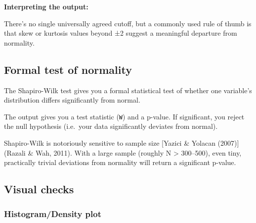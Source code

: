 \documentclass[
  letterpaper,
  DIV=11,
  numbers=noendperiod]{scrreprt}
\newenvironment{Shaded}{\begin{snugshade}}{\end{snugshade}}
\newcommand{\FunctionTok}[1]{\textcolor[rgb]{0.28,0.35,0.67}{#1}}
\newcommand{\NormalTok}[1]{\textcolor[rgb]{0.00,0.23,0.31}{#1}}
\newcommand{\SpecialCharTok}[1]{\textcolor[rgb]{0.37,0.37,0.37}{#1}}
\begin{document}
\textbf{Interpreting the output:}

There's no single universally agreed cutoff, but a commonly used rule of
thumb is that skew or kurtosis values beyond ±2 suggest a meaningful
departure from normality.

\subsection{Formal test of normality}\label{formal-test-of-normality}

The Shapiro-Wilk test gives you a formal statistical test of whether one
variable's distribution differs significantly from normal.

\begin{Shaded}
\end{Shaded}

The output gives you a test statistic (\texttt{W}) and a p-value. If
significant, you reject the null hypothesis (i.e.~your data
significantly deviates from normal).

\begin{tcolorbox}[enhanced jigsaw, toprule=.15mm, coltitle=black, colframe=quarto-callout-caution-color-frame, colbacktitle=quarto-callout-caution-color!10!white, opacityback=0, left=2mm, breakable, rightrule=.15mm, bottomrule=.15mm, leftrule=.75mm, titlerule=0mm, arc=.35mm, opacitybacktitle=0.6, toptitle=1mm, bottomtitle=1mm, title=\textcolor{quarto-callout-caution-color}{\faFire}\hspace{0.5em}{Sensitive to sample size}, colback=white]

Shapiro-Wilk is notoriously sensitive to sample size {[}Yazici \&
Yolacan (2007){]}(Razali \& Wah, 2011). With a large sample (roughly N
\textgreater{} 300--500), even tiny, practically trivial deviations from
normality will return a significant p-value.

\end{tcolorbox}

\subsection{Visual checks}\label{visual-checks}

\subsubsection{Histogram/Density plot}\label{histogramdensity-plot}
\end{document}
